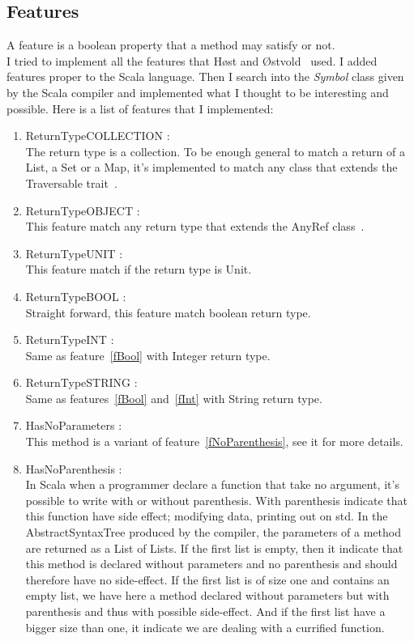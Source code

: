 \documentclass[12pt]{article}
\begin{document}
\subsection{Features}
\label{features}
A feature is a boolean property that a method may satisfy or not.\\
I tried to implement all the features that H{\o}st and {\O}stvold~\cite{DebugMN} used. I added features proper to the Scala language. Then I search into the \textit{Symbol} class given by the Scala compiler and implemented what I thought to be interesting and possible. Here is a list of features that I implemented:

\begin{enumerate}
\item ReturnTypeCOLLECTION :\\
	The return type is a collection. To be enough general to match a return of a List, a Set or a Map, it's implemented to match any class that extends the Traversable trait~\cite{travers}.
\item ReturnTypeOBJECT : \\
	This feature match any return type that extends the AnyRef class~\cite{anyRef}.
\item ReturnTypeUNIT :\\
	This feature match if the return type is Unit.
\item ReturnTypeBOOL : \label{fBool}\\
	Straight forward, this feature match boolean return type.
\item ReturnTypeINT :\label{fInt}\\
	Same as feature~\ref{fBool} with Integer return type.
\item ReturnTypeSTRING : \\
	Same as features~\ref{fBool} and~\ref{fInt} with String return type.
\item HasNoParameters :\label{fNoParam}\\
	This method is a variant of feature~\ref{fNoParenthesis}, see it for more details.
\item HasNoParenthesis :\label{fNoParenthesis}\\
In Scala when a programmer declare a function that take no argument, it's possible to write with or without parenthesis. With parenthesis indicate that this function have side effect; modifying data, printing out on std. In the AbstractSyntaxTree produced by the compiler, the parameters of a method are returned as a List of Lists. If the first list is empty, then it indicate that this method is declared without parameters and no parenthesis and should therefore have no side-effect. If the first list is of size one and contains an empty list, we have here a method declared without parameters but with parenthesis and thus with possible side-effect. And if the first list have a bigger size than one, it indicate we are dealing with a currified function.

\end{enumerate}
\end{document}
